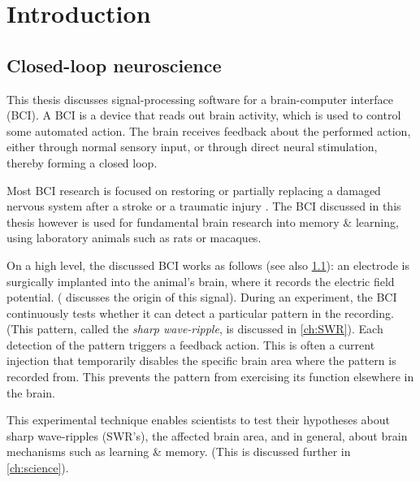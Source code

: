 \chapter{Introduction}



\section{Closed-loop neuroscience}
\label{sec:BCI}

This thesis discusses signal-processing software for a brain-computer interface (BCI). A BCI is a device that reads out brain activity, which is used to control some automated action. The brain receives feedback about the performed action, either through normal sensory input, or through direct neural stimulation, thereby forming a closed loop.

Most BCI research is focused on restoring or partially replacing a damaged nervous system after a stroke or a traumatic injury \cite{Krucoff2016}. The BCI discussed in this thesis however is used for fundamental brain research into memory \& learning, using laboratory animals such as rats or macaques.

On a high level, the discussed BCI works as follows (see also \cref{fig:closed-loop}): an electrode is surgically implanted into the animal's brain, where it records the electric field potential. ( discusses the origin of this signal). During an experiment, the BCI continuously tests whether it can detect a particular pattern in the recording. (This pattern, called the \emph{sharp wave-ripple}, is discussed in \cref{ch:SWR}). Each detection of the pattern triggers a feedback action. This is often a current injection that temporarily disables the specific brain area where the pattern is recorded from. This prevents the pattern from exercising its function elsewhere in the brain.

This experimental technique enables scientists to test their hypotheses about sharp wave-ripples (SWR's), the affected brain area, and in general, about brain mechanisms such as learning \& memory. (This is discussed further in \cref{ch:science}).


\begin{figure}
\label{fig:closed-loop}
\end{figure}



